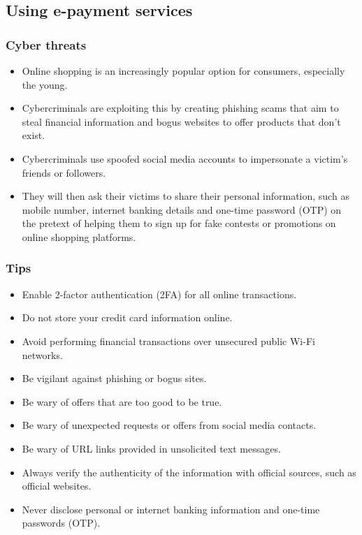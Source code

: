 \documentclass[11pt]{article}
\begin{document}
 \newpage

\subsection{Using e-payment services}
\label{sec:org0a4c7b8}

\subsubsection{Cyber threats}
\label{sec:orgbb96664}
\begin{itemize}
\item Online shopping is an increasingly popular option for consumers, especially the young.
\item Cybercriminals are exploiting this by creating phishing scams that aim to steal financial information and bogus websites to offer products that don't exist.
\item Cybercriminals use spoofed social media accounts to impersonate a victim's friends or followers.
\item They will then ask their victims to share their personal information, such as mobile number, internet banking details and one-time password (OTP) on the pretext of helping them to sign up for fake contests or promotions on online shopping platforms.
\end{itemize}

\subsubsection{Tips}
\label{sec:org234cf95}
\begin{itemize}
\item Enable 2-factor authentication (2FA) for all online transactions.
\item Do not store your credit card information online.
\item Avoid performing financial transactions over unsecured public Wi-Fi networks.
\item Be vigilant against phishing or bogus sites.
\item Be wary of offers that are too good to be true.
\item Be wary of unexpected requests or offers from social media contacts.
\item Be wary of URL links provided in unsolicited text messages.
\item Always verify the authenticity of the information with official sources, such as official websites.
\item Never disclose personal or internet banking information and one-time passwords (OTP).
\end{itemize}
\end{document}
